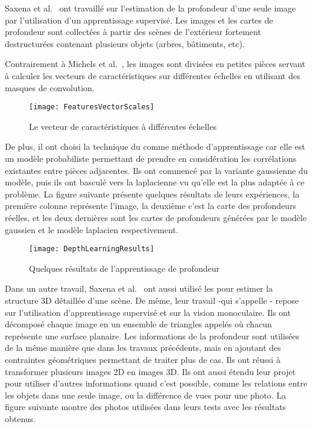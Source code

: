 Saxena et al.~\cite{saxena2005learning} ont travaillé sur l'estimation de la
profondeur d'une seule image par l'utilisation d'un apprentissage supervisé.
Les images et les cartes de profondeur sont collectées à partir des scènes de
l'extérieur fortement destructurées contenant plusieurs objets (arbres, bâtiments, etc).

Contrairement à Michels et al.~\cite{michels2005high}, les images sont divisées en petites
pièces servant à calculer les vecteurs de caractéristiques sur différentes
échelles en utilisant des masques de convolution.

\begin{figure}[H]
\begin{center}
\texttt{[image: FeaturesVectorScales]}
\caption{Le vecteur de caractéristiques à différentes échelles}{\cite{saxena2005learning}}
\end{center}
\end{figure}

De plus, il ont choisi la technique du  comme
méthode d'apprentissage car elle est un modèle probabiliste permettant de
prendre en considération les corrélations existantes entre pièces adjacentes.
Ils ont commencé par la variante gaussienne du modèle, puis ils ont
basculé vers la laplacienne vu qu'elle est la plus adaptée à ce problème.
La figure suivante présente quelques résultats de leurs expériences, la première
colonne représente l'image, la deuxième c'est la carte des profondeurs réelles, et
les deux dernières sont les cartes de profondeurs générées par le modèle gaussien
et le modèle laplacien respectivement.

\begin{figure}[H]
\begin{center}
\texttt{[image: DepthLearningResults]}
\caption{Quelques résultats de l'apprentissage de profondeur}{\cite{saxena2005learning}}
\end{center}
\end{figure}

Dans un autre travail, Saxena et al.~\cite{saxena2009make3d} ont aussi utilisé les
pour estimer la structure 3D détaillée d'une scène. De même, leur travail -qui
s'appelle - repose sur l'utilisation d'apprentissage supervisé et
sur la vision monoculaire. Ils ont décomposé chaque image en un ensemble de
triangles appelés  où chacun représente une surface planaire.
Les informations de la profondeur sont utilisées de la même manière que dans les
travaux précédents, mais en ajoutant des contraintes géométriques permettant de
traiter plus de cas. Ils ont réussi à transformer plusieurs images 2D en
images 3D. Ils ont aussi étendu leur projet pour utiliser d'autres informations
quand c'est possible, comme les relations entre les objets dans une seule image, ou
la différence de vues pour une photo. La figure suivante montre des photos
utilisées dans leurs tests avec les résultats obtenus.

